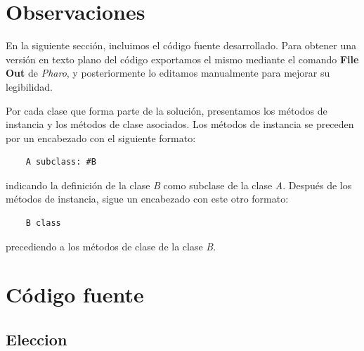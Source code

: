 \documentclass[a4paper, 10pt, twoside]{article}
\begin{document}
\newpage



\tableofcontents

\newpage



\section{Observaciones}

En la siguiente sección, incluimos el código fuente desarrollado. Para obtener una versión en texto plano del código exportamos el mismo mediante el comando \textbf{File Out} de \emph{Pharo}, y posteriormente lo editamos manualmente para mejorar su legibilidad.

Por cada clase que forma parte de la solución, presentamos los métodos de instancia y los métodos de clase asociados. Los métodos de instancia se preceden por un encabezado con el siguiente formato:

\begin{verbatim}
    A subclass: #B
\end{verbatim}

indicando la definición de la clase \emph{B} como subclase de la clase \emph{A}. Después de los métodos de instancia, sigue un encabezado con este otro formato:

\begin{verbatim}
    B class
\end{verbatim}

precediendo a los métodos de clase de la clase \emph{B}.

\section{Código fuente}

\subsection{Eleccion}

\end{document}

